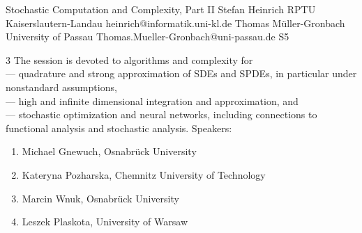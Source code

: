 

\clearpage

\begin{session}
 {Stochastic Computation and Complexity, Part II}%
 {Stefan Heinrich}%
 {RPTU Kaiserslautern-Landau}%
 {heinrich@informatik.uni-kl.de}%
 {Thomas M\"uller-Gronbach}%
 {University of Passau}%
 {Thomas.Mueller-Gronbach@uni-passau.de}%
 {S5}%
 {}%

 {3} %
 The session is devoted to algorithms and complexity for\\
 --- quadrature and strong approximation of SDEs and SPDEs, in particular under nonstandard assumptions,\\
 --- high and infinite dimensional integration and approximation, and\\
 --- stochastic optimization and neural networks,
 including connections to functional analysis and stochastic analysis.
 \medskip
 Speakers:
 \begin{enumerate}
 \item Michael Gnewuch, Osnabr\"uck University
 \item Kateryna Pozharska, Chemnitz University of Technology
 \item Marcin Wnuk, Osnabr\"uck University
 \item Leszek Plaskota, University of Warsaw
 \end{enumerate}
\end{session}



\clearpage

